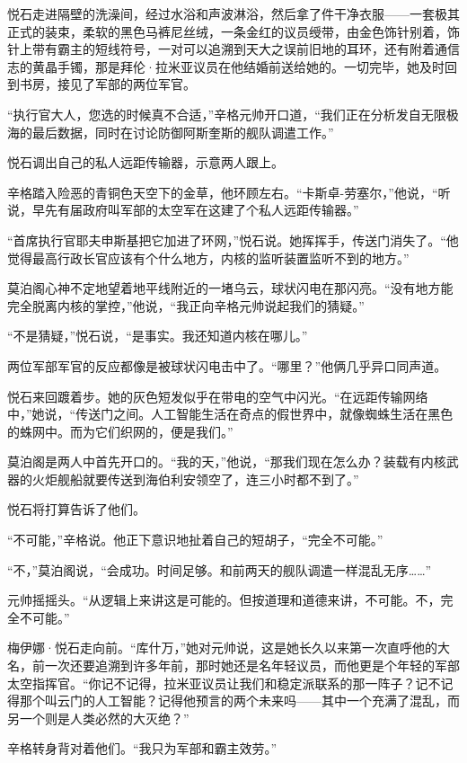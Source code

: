 \documentclass[AutoFakeBold=true]{book}
\begin{document}
悦石走进隔壁的洗澡间，经过水浴和声波淋浴，然后拿了件干净衣服——一套极其正式的装束，柔软的黑色马裤尼丝绒，一条金红的议员绶带，由金色饰针别着，饰针上带有霸主的短线符号，一对可以追溯到天大之误前旧地的耳环，还有附着通信志的黄晶手镯，那是拜伦·拉米亚议员在他结婚前送给她的。一切完毕，她及时回到书房，接见了军部的两位军官。

``执行官大人，您选的时候真不合适，''辛格元帅开口道，``我们正在分析发自无限极海的最后数据，同时在讨论防御阿斯奎斯的舰队调遣工作。''

悦石调出自己的私人远距传输器，示意两人跟上。

辛格踏入险恶的青铜色天空下的金草，他环顾左右。``卡斯卓-劳塞尔，''他说，``听说，早先有届政府叫军部的太空军在这建了个私人远距传输器。''

``首席执行官耶夫申斯基把它加进了环网，''悦石说。她挥挥手，传送门消失了。``他觉得最高行政长官应该有个什么地方，内核的监听装置监听不到的地方。''

莫泊阁心神不定地望着地平线附近的一堵乌云，球状闪电在那闪亮。``没有地方能完全脱离内核的掌控，''他说，``我正向辛格元帅说起我们的猜疑。''

``不是猜疑，''悦石说，``是事实。我还知道内核在哪儿。''

两位军部军官的反应都像是被球状闪电击中了。``哪里？''他俩几乎异口同声道。

悦石来回踱着步。她的灰色短发似乎在带电的空气中闪光。``在远距传输网络中，''她说，``传送门之间。人工智能生活在奇点的假世界中，就像蜘蛛生活在黑色的蛛网中。而为它们织网的，便是我们。''

莫泊阁是两人中首先开口的。``我的天，''他说，``那我们现在怎么办？装载有内核武器的火炬舰船就要传送到海伯利安领空了，连三小时都不到了。''

悦石将打算告诉了他们。

``不可能，''辛格说。他正下意识地扯着自己的短胡子，``完全不可能。''

``不，''莫泊阁说，``会成功。时间足够。和前两天的舰队调遣一样混乱无序……''

元帅摇摇头。``从逻辑上来讲这是可能的。但按道理和道德来讲，不可能。不，完全不可能。''

梅伊娜·悦石走向前。``库什万，''她对元帅说，这是她长久以来第一次直呼他的大名，前一次还要追溯到许多年前，那时她还是名年轻议员，而他更是个年轻的军部太空指挥官。``你记不记得，拉米亚议员让我们和稳定派联系的那一阵子？记不记得那个叫云门的人工智能？记得他预言的两个未来吗——其中一个充满了混乱，而另一个则是人类必然的大灭绝？''

辛格转身背对着他们。``我只为军部和霸主效劳。''
\end{document}
